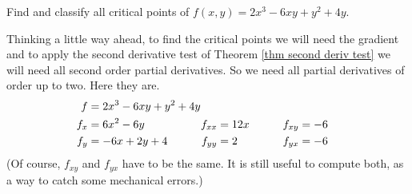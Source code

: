 \goodbreak
\medskip
\begin{eg}[$f(x,y)=2x^3 - 6xy + y^2 +4y $]\label{eg:MXMNlocalBb}
Find and classify all critical points of $f(x,y)=2x^3 - 6xy + y^2 +4y $.

\soln 
Thinking a little way ahead, to find the critical points we will need the
gradient and to apply the second derivative test of 
Theorem \ref{thm second deriv test} we will need all second order partial derivatives. So we need all partial derivatives of order up to two.
Here they are.
\begin{alignat*}{3}
f&=2x^3 - 6xy + y^2 +4y \hidewidth\\
f_x&=6x^2-6y   & f_{xx}&=12x \qquad & f_{xy}&= -6\\
f_y&=-6x+2y+4 \qquad & f_{yy}&=2\qquad & f_{yx}&= -6
\end{alignat*}
(Of course, $f_{xy}$ and $f_{yx}$ have to be the same. It is still
useful to compute both, as a way to catch some mechanical errors.)


\end{eg}

